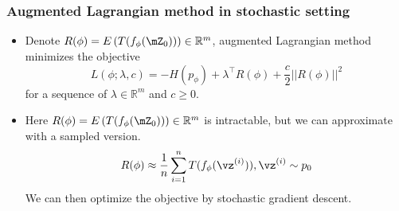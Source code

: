 \documentclass[16pt,presentation]{beamer}
\begin{document}
\begin{frame}
\frametitle{Augmented Lagrangian method in stochastic setting}
\begin{itemize}
\item Denote $R(\phi) = E\left(T(f_\phi( \mZ_0))\right) \in \mathbb{R}^m$, augmented Lagrangian method minimizes the objective
\[L(\phi; \lambda, c) = - H(p_\phi) + \lambda^{\top} R(\phi) + \dfrac{c}{2}||R(\phi)||^2\]
for a sequence of $\lambda \in \mathbb{R}^m$ and $c \geq 0$.
\item Here $R(\phi) = E\left(T(f_\phi( \mZ_0))\right) \in \mathbb{R}^m$ is intractable, but we can approximate with a sampled version.
\[R(\phi) \approx \frac{1}{n} \sum_{i=1}^nT(f_\phi( \vz^{(i)})), \vz^{(i)} \sim p_0\]
We can then optimize the objective by stochastic gradient descent.
\end{itemize}
\end{frame}
\end{document}
